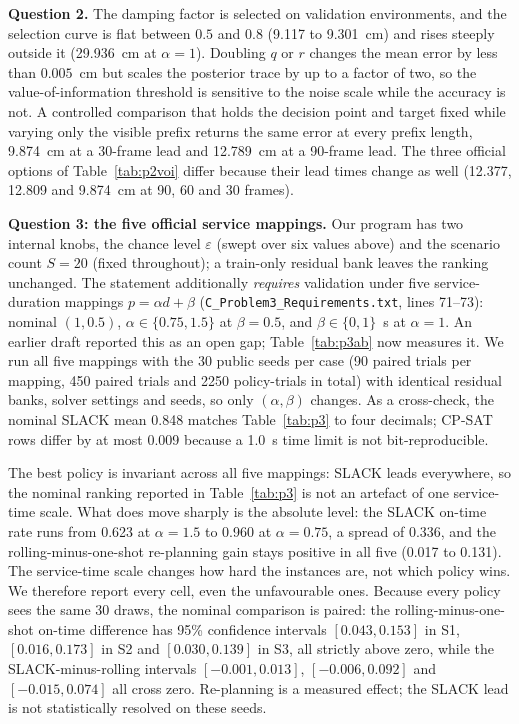 \documentclass{swmcmthesis}
\begin{document}
\textbf{Question 2.} The damping factor is selected on validation environments, and the selection curve is flat between $0.5$ and $0.8$ (9.117 to 9.301~cm) and rises steeply outside it (29.936~cm at $\alpha=1$). Doubling $q$ or $r$ changes the mean error by less than $0.005$~cm but scales the posterior trace by up to a factor of two, so the value-of-information threshold is sensitive to the noise scale while the accuracy is not. A controlled comparison that holds the decision point and target fixed while varying only the visible prefix returns the same error at every prefix length, 9.874~cm at a 30-frame lead and 12.789~cm at a 90-frame lead. The three official options of Table~\ref{tab:p2voi} differ because their lead times change as well (12.377, 12.809 and 9.874~cm at 90, 60 and 30 frames).

\textbf{Question 3: the five official service mappings.} Our program has two internal knobs, the chance level $\varepsilon$ (swept over six values above) and the scenario count $S=20$ (fixed throughout); a train-only residual bank leaves the ranking unchanged. The statement additionally \emph{requires} validation under five service-duration mappings $p=\alpha d+\beta$ (\texttt{C\_Problem3\_Requirements.txt}, lines 71--73): nominal $(1,0.5)$, $\alpha\in\{0.75,1.5\}$ at $\beta=0.5$, and $\beta\in\{0,1\}$~s at $\alpha=1$. An earlier draft reported this as an open gap; Table~\ref{tab:p3ab} now measures it. We run all five mappings with the 30 public seeds per case (90 paired trials per mapping, 450 paired trials and 2250 policy-trials in total) with identical residual banks, solver settings and seeds, so only $(\alpha,\beta)$ changes. As a cross-check, the nominal SLACK mean 0.848 matches Table~\ref{tab:p3} to four decimals; CP-SAT rows differ by at most 0.009 because a 1.0~s time limit is not bit-reproducible.

The best policy is invariant across all five mappings: SLACK leads everywhere, so the nominal ranking reported in Table~\ref{tab:p3} is not an artefact of one service-time scale. What does move sharply is the absolute level: the SLACK on-time rate runs from 0.623 at $\alpha=1.5$ to 0.960 at $\alpha=0.75$, a spread of 0.336, and the rolling-minus-one-shot re-planning gain stays positive in all five (0.017 to 0.131). The service-time scale changes how hard the instances are, not which policy wins. We therefore report every cell, even the unfavourable ones. Because every policy sees the same 30 draws, the nominal comparison is paired: the rolling-minus-one-shot on-time difference has 95\% confidence intervals $[0.043,0.153]$ in S1, $[0.016,0.173]$ in S2 and $[0.030,0.139]$ in S3, all strictly above zero, while the SLACK-minus-rolling intervals $[-0.001,0.013]$, $[-0.006,0.092]$ and $[-0.015,0.074]$ all cross zero. Re-planning is a measured effect; the SLACK lead is not statistically resolved on these seeds.
\end{document}
